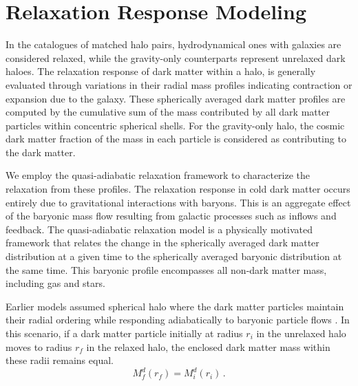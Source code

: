 \section{Relaxation Response Modeling}
\label{sec:methods-relmodel}
In the catalogues of matched halo pairs, hydrodynamical ones with galaxies are considered relaxed, while the gravity-only counterparts represent unrelaxed dark haloes. The relaxation response of dark matter within a halo, is generally evaluated through variations in their radial mass profiles indicating contraction or expansion due to the galaxy.  These spherically averaged dark matter profiles are computed by the cumulative sum of the mass contributed by all dark matter particles within concentric spherical shells. For the gravity-only halo, the cosmic dark matter fraction of the mass in each particle is considered as contributing to the dark matter. 

We employ the quasi-adiabatic relaxation framework to characterize the relaxation from these profiles.
The relaxation response in cold dark matter occurs entirely due to gravitational interactions with baryons. This is an aggregate effect of the baryonic mass flow resulting from galactic processes such as inflows and feedback. The quasi-adiabatic relaxation model is a physically motivated framework that relates the change in the spherically averaged dark matter distribution at a given time to the spherically averaged baryonic distribution at the same time. This baryonic profile encompasses all non-dark matter mass, including gas and stars.

Earlier models assumed spherical halo where the dark matter particles maintain their radial ordering while responding adiabatically to baryonic particle flows \citep[][]{1986ApJ...301...27B}. In this scenario, if a dark matter particle initially at radius \( r_i \) in the unrelaxed halo moves to radius \( r_f \) in the relaxed halo, the enclosed dark matter mass within these radii remains equal.
\begin{equation} 
M_f^d(r_f) = M_i^d(r_i)\,.
\label{eq:DMmass}
\end{equation}

